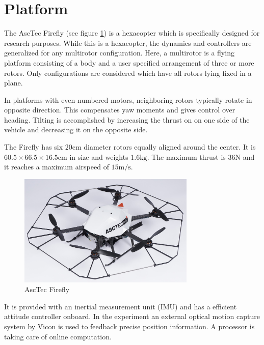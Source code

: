 \section{Platform}
The AscTec Firefly (see figure \ref{pics:firefly}) is a hexacopter which is specifically designed for research purposes. While this is a hexacopter, the dynamics and controllers are generalized for any multirotor configuration. Here, a multirotor is a flying platform consisting of a body and a user specified arrangement of three or more rotors. Only configurations are considered which have all rotors lying fixed in a plane.

In platforms with even-numbered motors, neighboring rotors typically rotate in opposite direction. This compensates yaw moments and gives control over heading. Tilting is accomplished by increasing the thrust on on one side of the vehicle and decreasing it on the opposite side.

The Firefly has six $20 \si{\cm}$ diameter rotors equally aligned around the center. It is $60.5 \times 66.5 \times 16.5 \si{\cm}$ in size and weights $1.6 \si{\kg}$. The maximum thrust is $36 \si{\N}$ and it reaches a maximum airspeed of $15 \si{\metre\per\second}$.

\begin{figure}
   \centering
   \includegraphics[width=0.75\textwidth]{images/firefly.jpg}
   \caption{AscTec Firefly \cite{www:asctec}}
   \label{pics:firefly}
\end{figure}

It is provided with an inertial measurement unit (IMU) and has a efficient attitude controller onboard. In the experiment an external optical motion capture system by Vicon is used to feedback precise position information. A processor is taking care of online computation.

